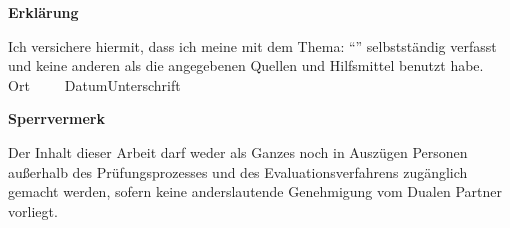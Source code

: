 

\newpage
\thispagestyle{empty}
\begin{framed}
\begin{center}
\Large\bfseries Erklärung
\end{center}
\medskip
\noindent
Ich versichere hiermit, dass ich meine \Was mit dem Thema:
\enquote{\Titel}
selbstständig verfasst und keine anderen als die angegebenen Quellen und Hilfsmittel benutzt habe.
\vspace{3cm}
\noindent
\underline{\hspace{4cm}}\hfill\underline{\hspace{6cm}}\\
Ort~~~~~Datum\hfill Unterschrift\hspace{4cm}
\end{framed}

\vfill
\begin{framed}
\begin{center}
\Large\bfseries Sperrvermerk
\end{center}
\medskip
\noindent
Der Inhalt dieser Arbeit darf weder als Ganzes noch in Auszügen Personen
außerhalb des Prüfungsprozesses und des Evaluationsverfahrens zugänglich gemacht
werden, sofern keine anderslautende Genehmigung vom Dualen Partner vorliegt.
\end{framed}

\endinput
